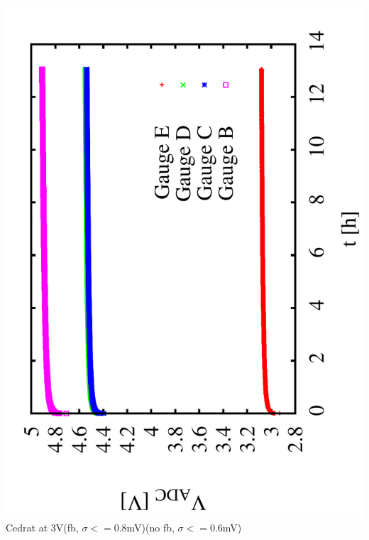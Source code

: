 \documentclass[a4paper,11pt]{book}
\begin{document}
 \includegraphics[angle=-90,scale=0.15]{image_ai_21.pdf}\\
Cedrat at 3V\hspace{0.4cm}(fb, $\sigma<=0.8$mV)\hspace{1.0cm}(no fb, $\sigma<=0.6$mV)\\
\end{document}
